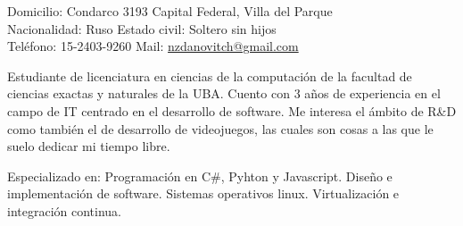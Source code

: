 \documentclass[10pt,a4paper]{article}
\begin{document}
\sloppy  %



\nobreakvspace{0.3em}  %

\noindent
Domicilio: Condarco 3193 \sbull Capital Federal, Villa del Parque \\
Nacionalidad: Ruso \sbull
Estado civil: Soltero sin hijos \\
Teléfono: 15-2403-9260 \sbull
Mail: \href{mailto:nzdanovitch.at.gmail.dot.com}{nzdanovitch\mbox{}@\mbox{}gmail.com}


\spacedhrule{0.9em}{-0.4em}  %


\vspace{-1.3em}  %
\begin{multicols}{2}  %
\noindent 
Estudiante de licenciatura en ciencias de la computación de la facultad de ciencias exactas y naturales de la UBA.
Cuento con 3 años de experiencia en el campo de IT centrado en el desarrollo de software.
Me interesa el ámbito de R\&D como también el de desarrollo de videojuegos, las cuales son cosas a las que le suelo dedicar mi tiempo libre.
\end{multicols}


\spacedhrule{0.0em}{-0.4em}


\inlineheadsection  %
  {Especializado en:}
  {Programación en C\#, Pyhton y Javascript. Diseño e implementación de software. Sistemas operativos linux. Virtualización e integración continua.}
\end{document}
